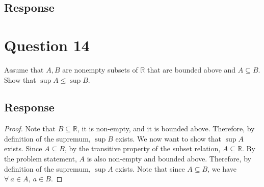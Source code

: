 \documentclass[13pt]{article}
\begin{document}
\subsection*{Response}

\newpage
\section*{Question 14}
Assume that $A, B$ are nonempty subsets of $\mathbb{R}$ that are bounded above and $A \subseteq
B$. Show that $\sup{A} \leq \sup{B}$.
\subsection*{Response}
\begin{proof}
  Note that $B \subseteq \mathbb{R}$, it is non-empty, and it is bounded above. Therefore, by definition of
  the supremum, $\sup{B}$ exists. We now want to show that $\sup{A}$ exists. Since $A \subseteq B$, by the
  transitive property of the subset relation, $A \subseteq \mathbb{R}$. By the problem statement, $A$ is also
  non-empty and bounded above. Therefore, by definition of the supremum, $\sup{A}$ exists. Note that since
  $A \subseteq B$, we have $\forall \ a \in A, \ a \in B$. 
\end{proof}
\end{document}
